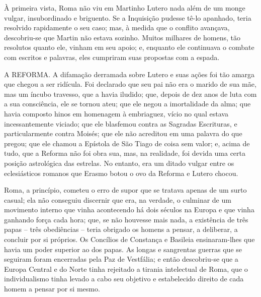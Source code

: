 \documentclass[11pt,a5paper,twoside,openany]{book}
\begin{document}
À primeira vista, Roma não viu em Martinho Lutero nada além de um monge vulgar, insubordinado e briguento. Se a Inquisição pudesse tê-lo apanhado, teria resolvido rapidamente o seu caso; mas, à medida que o conflito avançava, descobriu-se que Martin não estava sozinho. Muitos milhares de homens, tão resolutos quanto ele, vinham em seu apoio; e, enquanto ele continuava o combate com escritos e palavras, eles cumpriram suas propostas com a espada.

A REFORMA. A difamação derramada sobre Lutero e suas ações foi tão amarga que chegou a ser ridícula. Foi declarado que seu pai não era o marido de sua mãe, mas um íncubo travesso, que a havia iludido; que, depois de dez anos de luta com a sua consciência, ele se tornou ateu; que ele negou a imortalidade da alma; que havia composto hinos em homenagem à embriaguez, vício no qual estava incessantemente viciado; que ele blasfemou contra as Sagradas Escrituras, e particularmente contra Moisés; que ele não acreditou em uma palavra do que pregou; que ele chamou a Epístola de São Tiago de coisa sem valor; e, acima de tudo, que a Reforma não foi obra sua, mas, na realidade, foi devida uma certa posição astrológica das estrelas. No entanto, era um ditado vulgar entre os eclesiásticos romanos que Erasmo botou o ovo da Reforma e Lutero chocou.

Roma, a princípio, cometeu o erro de supor que se tratava apenas de um surto casual; ela não conseguiu discernir que era, na verdade, o culminar de um movimento interno que vinha acontecendo há dois séculos na Europa e que vinha ganhando força cada hora; que, se não houvesse mais nada, a existência de três papas – três obediências – teria obrigado os homens a pensar, a deliberar, a concluir por si próprios. Os Concílios de Constança e Basileia ensinaram-lhes que havia um poder superior ao dos papas. As longas e sangrentas guerras que se seguiram foram encerradas pela Paz de Vestfália; e então descobriu-se que a Europa Central e do Norte tinha rejeitado a tirania intelectual de Roma, que o individualismo tinha levado a cabo seu objetivo e estabelecido direito de cada homem a pensar por si mesmo.
\end{document}
